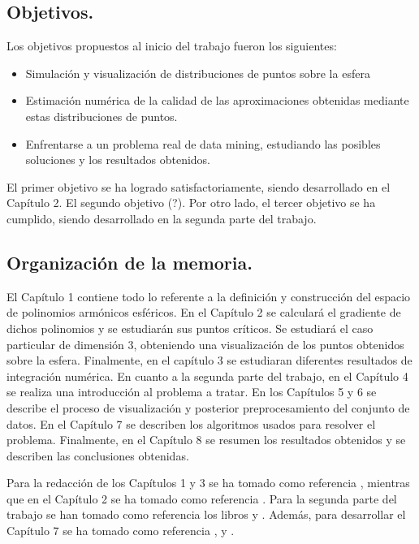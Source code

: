 \subsection{Objetivos.}
Los objetivos propuestos al inicio del trabajo fueron los siguientes:
\begin{itemize}
	\item Simulación y visualización de distribuciones de puntos sobre la esfera
	\item Estimación numérica de la calidad de las aproximaciones obtenidas mediante estas distribuciones de puntos. 
	\item Enfrentarse a un problema real de data mining, estudiando las posibles soluciones y los resultados obtenidos.
\end{itemize}

El primer objetivo se ha logrado satisfactoriamente, siendo desarrollado en el Capítulo 2. El segundo objetivo (?). 
Por otro lado, el tercer objetivo se ha cumplido, siendo desarrollado en la segunda parte del trabajo.

\subsection{Organización de la memoria.}
\medskip

El Capítulo 1 contiene todo lo referente a la definición y construcción del espacio de polinomios armónicos esféricos.
En el Capítulo 2 se calculará el gradiente de dichos polinomios y se estudiarán sus puntos críticos. Se estudiará el caso particular de dimensión 3, obteniendo una visualización de los puntos obtenidos sobre la esfera.
Finalmente, en el capítulo 3 se estudiaran diferentes resultados de integración numérica.
En cuanto a la segunda parte del trabajo, en el Capítulo 4 se realiza una introducción al problema a tratar. 
En los Capítulos 5 y 6 se describe el proceso de visualización y posterior preprocesamiento del conjunto de datos.
En el Capítulo 7 se describen los algoritmos usados para resolver el problema.
Finalmente, en el Capítulo 8 se resumen los resultados obtenidos y se describen las conclusiones obtenidas.

\medskip 

Para la redacción de los Capítulos 1 y 3 se ha tomado como referencia \cite{libro_esfarm}, mientras que en el Capítulo 2 se ha tomado como referencia \cite{art_grad}. Para la segunda parte del trabajo se han tomado como referencia los libros \cite{data_mining} y \cite[]{}. Además, para desarrollar el Capítulo 7 se ha tomado como referencia \cite{boosting}, \cite{rusboost} y \cite{cusboost}. 